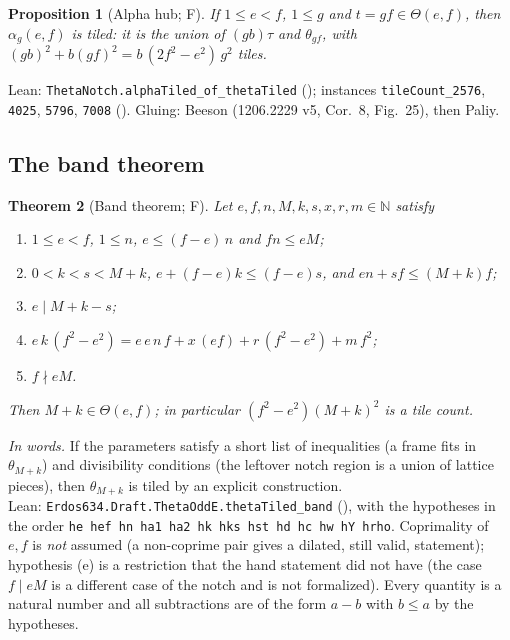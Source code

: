 \documentclass[11pt,reqno]{amsart}
\theoremstyle{plain}
\newtheorem{theorem}{Theorem}[section]
\newtheorem{proposition}[theorem]{Proposition}
\theoremstyle{definition}
\newcommand{\N}{\mathbb{N}}
\newcommand{\sF}{\textup{\textsf{F}}}
\begin{document}
\begin{proposition}[Alpha hub; \sF]\label{prop:hub}
If $1\le e<f$, $1\le g$ and $t=gf\in\Theta(e,f)$, then $\alpha_g(e,f)$ is tiled: it is the union of $(gb)\tau$ and
$\theta_{gf}$, with $(gb)^2+b(gf)^2=b\,(2f^2-e^2)\,g^2$ tiles.
\end{proposition}
\noindent Lean: \texttt{ThetaNotch.alphaTiled\_of\_thetaTiled} (); instances
\texttt{tileCount\_2576}, \texttt{4025}, \texttt{5796}, \texttt{7008} (). Gluing: Beeson (1206.2229 v5, Cor.~8,
Fig.~25), then Paliy.

\subsection{The band theorem}\label{sub:band:band}
\begin{theorem}[Band theorem; \sF]\label{thm:band}
Let $e,f,n,M,k,s,x,r,m\in\N$ satisfy
\begin{enumerate}
\item[(a)] $1\le e<f$, $1\le n$, $e\le(f-e)\,n$ and $fn\le eM$;
\item[(b)] $0<k<s<M+k$, $e+(f-e)k\le(f-e)s$, and $en+sf\le(M+k)f$;
\item[(c)] $e\mid M+k-s$;
\item[(d)] $e\,k\,(f^2-e^2)=e\,e\,n\,f+x\,(ef)+r\,(f^2-e^2)+m\,f^2$;
\item[(e)] $f\nmid eM$.
\end{enumerate}
Then $M+k\in\Theta(e,f)$; in particular $(f^2-e^2)(M+k)^2$ is a tile count.
\end{theorem}
\noindent\emph{In words.} If the parameters satisfy a short list of inequalities (a frame fits in $\theta_{M+k}$) and
divisibility conditions (the leftover notch region is a union of lattice pieces), then $\theta_{M+k}$ is tiled by an explicit construction.\\
\noindent Lean: \texttt{Erdos634.Draft.ThetaOddE.thetaTiled\_band} (), with the hypotheses
in the order \texttt{he hef hn ha1 ha2 hk hks hst hd hc hw hY hrho}. Coprimality of $e,f$ is \emph{not} assumed
(a non-coprime pair gives a dilated, still valid, statement); hypothesis (e) is a restriction that the hand
statement did not have (the case $f\mid eM$ is a different case of the notch and is not formalized). Every
quantity is a natural number and all subtractions are of the form $a-b$ with $b\le a$ by the hypotheses.
\end{document}
